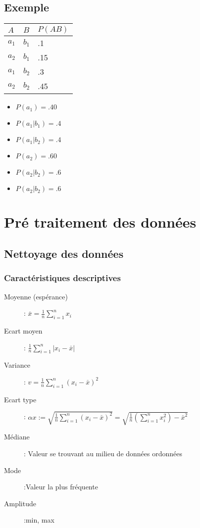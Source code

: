 \section{Exemple}
\begin{multicols}{2}
[]
\begin{tabular}{ll|l}
  \hline
  $A$&$B$&$P(AB)$\\
  \hline
  $a_1$&$b_1$&.1\\
  $a_2$&$b_1$&.15\\
  $a_1$&$b_2$&.3\\
  $a_2$&$b_2$&.45\\
  \hline
\end{tabular}

\begin{itemize}
\item $P(a_1) = .40$
\item $P(a_1|b_1) = .4$
\item $P(a_1|b_2) = .4$
\item $P(a_2) = .60$
\item $P(a_2|b_2) = .6$
\item $P(a_2|b_2) = .6$
\end{itemize}

\end{multicols}

\chapter{Pré traitement des données}
\section{Nettoyage des données}
\subsection{Caractéristiques descriptives}

\begin{description}
\item[Moyenne (espérance)]: $\overset{\_}{x}=\frac{1}{n} \sum_{i=1}^n x_i$
\item[Ecart moyen]: $\frac{1}{n} \sum_{i=1}^n |x_i - \overset{\_}{x} |$
\item[Variance]: $v = \frac{1}{n} \sum_{i=1}^n (x_i - \overset{\_}{x} )^2$
\item[Ecart type]: $\alpha x := \sqrt{\frac{1}{n} \sum_{i=1}^n (x_i - \overset{\_}{x} )^2} = \sqrt{\frac{1}{n}(\sum_{i=1}^n x_i^2) - \overset{\_}{x}^2 }$
\item[Médiane]: Valeur se trouvant au milieu de données ordonnées
\item[Mode]:Valeur la plus fréquente 
\item[Amplitude]:min, max
\end{description}

